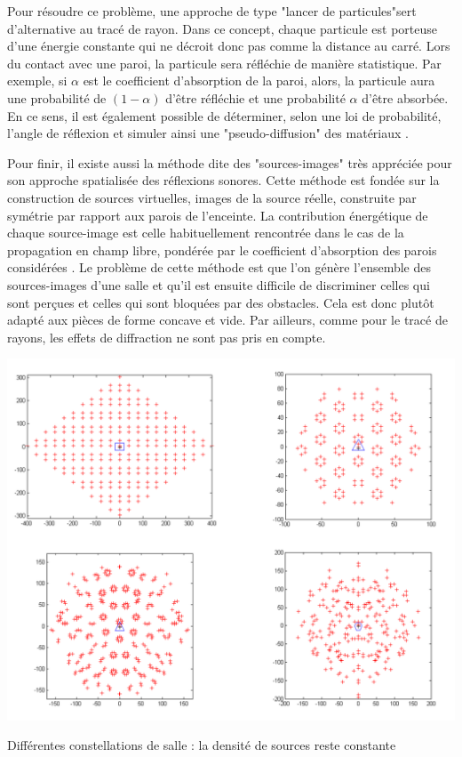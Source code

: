 Pour résoudre ce problème, une approche de type "lancer de particules"sert d'alternative au tracé de rayon. Dans ce concept, chaque particule est porteuse d’une énergie constante qui ne décroit donc pas comme la distance au carré. Lors du contact avec une paroi, la particule sera réfléchie de manière statistique. Par exemple, si $\alpha$ est le coefficient d'absorption de la paroi, alors, la particule aura une probabilité de $(1-\alpha)$ d'être réfléchie et une probabilité $\alpha$ d'être absorbée. En ce sens, il est également possible de déterminer, selon une loi de probabilité, l'angle de réflexion et simuler ainsi une "pseudo-diffusion" des matériaux \cite[p. 62]{picaut}.


Pour finir, il existe aussi la méthode dite des "sources-images" \cite[p.6]{jouhaneau} très appréciée pour son approche spatialisée des réflexions sonores. Cette méthode est fondée sur la construction de sources virtuelles, images de la source réelle, construite par symétrie par rapport aux parois de l'enceinte. La contribution énergétique de chaque source-image est celle habituellement rencontrée dans le cas de la propagation en champ libre, pondérée par le coefficient d’absorption des parois considérées \cite[p. 60]{picaut}.
Le problème de cette méthode est que l'on génère l'ensemble des sources-images d'une salle et qu'il est ensuite difficile de discriminer celles qui sont perçues et celles qui sont bloquées par des obstacles. Cela est donc plutôt adapté aux pièces de forme concave et vide. Par ailleurs, comme pour le tracé de rayons, les effets de diffraction ne sont pas pris en compte. 


\begin{figureth}
	\includegraphics[width=\linewidth]{images/constellations}
	\caption[Différentes constellations de salle : la densité de sources reste constante]{Différentes constellations de salle : la densité de sources reste constante \footnotemark}
	\label{constellations}
\end{figureth}

